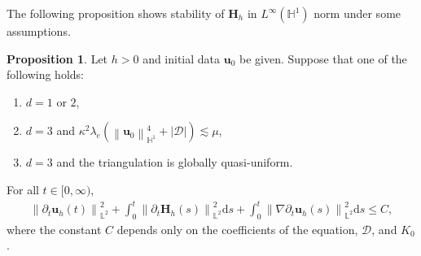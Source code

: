 \documentclass[11pt, reqno]{amsart}
\theoremstyle{definition}
\newtheorem{proposition}[theorem]{Proposition}
\theoremstyle{remark}
\numberwithin{equation}{section}
\newcommand{\bff}{\boldsymbol}
\newcommand{\bb}{\mathbb}
\newcommand{\ddt}{\frac{\mathrm{d}}{\mathrm{d}t}}
\newcommand{\ds}{\mathrm{d}s}
\newcommand{\norm}[2]{\left\|{#1}\right\|_{#2}}
\newcommand{\inpro}[2]{\left\langle#1,#2\right\rangle}
\newcommand{\abs}[1]{\left|{#1}\right|}
\begin{document}


The following proposition shows stability of $\bff{H}_h$ in $L^\infty(\bb{H}^1)$ norm under some assumptions.

\begin{proposition}\label{pro:dt uh L2 assum}
Let $h>0$ and initial data $\bff{u}_0$ be given. Suppose that one of the following holds:
\begin{enumerate}
	\item $d=1$ or $2$,
	\item $d=3$ and $\kappa^2 \lambda_e \left(\norm{\bff{u}_0}{\bb{H}^1}^4 + |\mathscr{D}|\right)\lesssim \mu$,
	\item $d=3$ and the triangulation is globally quasi-uniform.
\end{enumerate}
For all $t\in [0,\infty)$,
\begin{align}\label{equ:semidisc-est3}
	\norm{\partial_t \bff{u}_h(t)}{\bb{L}^2}^2
	+ \int_0^t \norm{\partial_t \bff{H}_h(s)}{\bb{L}^2}^2 \ds
	+ \int_0^t \norm{\nabla \partial_t \bff{u}_h(s)}{\bb{L}^2}^2 \ds
	\leq
	C,
\end{align}
where the constant $C$ depends only on the coefficients of the equation, $\mathscr{D}$, and $K_0$.
\end{proposition}
\end{document}
